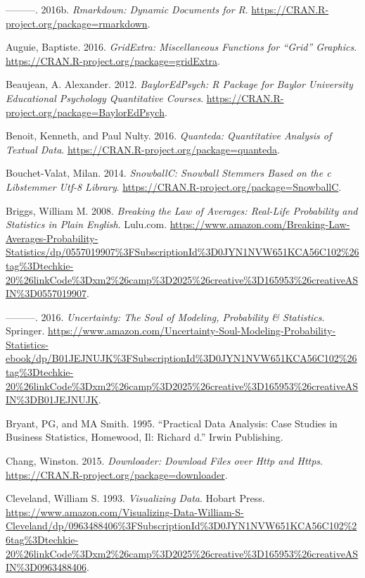 \documentclass[12pt,]{book}
\begin{document}
\hypertarget{ref-R-rmarkdown}{}
---------. 2016b. \emph{Rmarkdown: Dynamic Documents for R}.
\url{https://CRAN.R-project.org/package=rmarkdown}.

\hypertarget{ref-R-gridExtra}{}
Auguie, Baptiste. 2016. \emph{GridExtra: Miscellaneous Functions for
``Grid'' Graphics}. \url{https://CRAN.R-project.org/package=gridExtra}.

\hypertarget{ref-R-BaylorEdPsych}{}
Beaujean, A. Alexander. 2012. \emph{BaylorEdPsych: R Package for Baylor
University Educational Psychology Quantitative Courses}.
\url{https://CRAN.R-project.org/package=BaylorEdPsych}.

\hypertarget{ref-R-quanteda}{}
Benoit, Kenneth, and Paul Nulty. 2016. \emph{Quanteda: Quantitative
Analysis of Textual Data}.
\url{https://CRAN.R-project.org/package=quanteda}.

\hypertarget{ref-R-SnowballC}{}
Bouchet-Valat, Milan. 2014. \emph{SnowballC: Snowball Stemmers Based on
the c Libstemmer Utf-8 Library}.
\url{https://CRAN.R-project.org/package=SnowballC}.

\hypertarget{ref-breaking}{}
Briggs, William M. 2008. \emph{Breaking the Law of Averages: Real-Life
Probability and Statistics in Plain English}. Lulu.com.
\url{https://www.amazon.com/Breaking-Law-Averages-Probability-Statistics/dp/0557019907\%3FSubscriptionId\%3D0JYN1NVW651KCA56C102\%26tag\%3Dtechkie-20\%26linkCode\%3Dxm2\%26camp\%3D2025\%26creative\%3D165953\%26creativeASIN\%3D0557019907}.

\hypertarget{ref-uncertainty}{}
---------. 2016. \emph{Uncertainty: The Soul of Modeling, Probability \&
Statistics}. Springer.
\url{https://www.amazon.com/Uncertainty-Soul-Modeling-Probability-Statistics-ebook/dp/B01JEJNUJK\%3FSubscriptionId\%3D0JYN1NVW651KCA56C102\%26tag\%3Dtechkie-20\%26linkCode\%3Dxm2\%26camp\%3D2025\%26creative\%3D165953\%26creativeASIN\%3DB01JEJNUJK}.

\hypertarget{ref-bryant1995practical}{}
Bryant, PG, and MA Smith. 1995. ``Practical Data Analysis: Case Studies
in Business Statistics, Homewood, Il: Richard d.'' Irwin Publishing.

\hypertarget{ref-R-downloader}{}
Chang, Winston. 2015. \emph{Downloader: Download Files over Http and
Https}. \url{https://CRAN.R-project.org/package=downloader}.

\hypertarget{ref-Cleveland}{}
Cleveland, William S. 1993. \emph{Visualizing Data}. Hobart Press.
\url{https://www.amazon.com/Visualizing-Data-William-S-Cleveland/dp/0963488406\%3FSubscriptionId\%3D0JYN1NVW651KCA56C102\%26tag\%3Dtechkie-20\%26linkCode\%3Dxm2\%26camp\%3D2025\%26creative\%3D165953\%26creativeASIN\%3D0963488406}.
\end{document}
